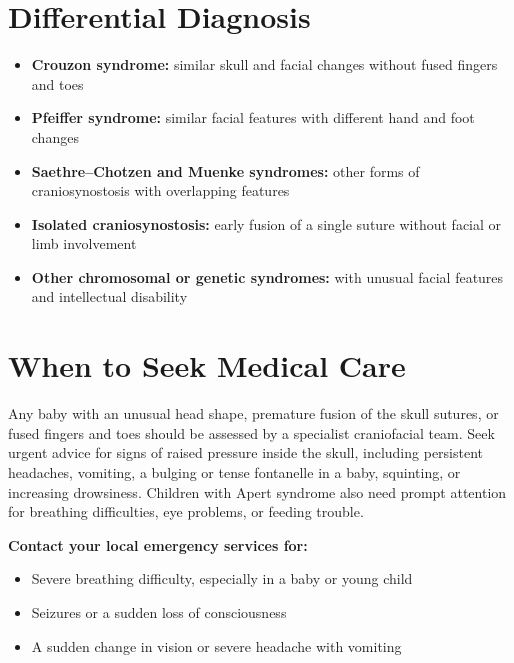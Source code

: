 \section*{Differential Diagnosis}
\begin{itemize}
    \item \textbf{Crouzon syndrome:} similar skull and facial changes without fused fingers and toes
    \item \textbf{Pfeiffer syndrome:} similar facial features with different hand and foot changes
    \item \textbf{Saethre--Chotzen and Muenke syndromes:} other forms of craniosynostosis with overlapping features
    \item \textbf{Isolated craniosynostosis:} early fusion of a single suture without facial or limb involvement
    \item \textbf{Other chromosomal or genetic syndromes:} with unusual facial features and intellectual disability
\end{itemize}

\section*{When to Seek Medical Care}
Any baby with an unusual head shape, premature fusion of the skull sutures, or fused fingers and toes should be assessed by a specialist craniofacial team. Seek urgent advice for signs of raised pressure inside the skull, including persistent headaches, vomiting, a bulging or tense fontanelle in a baby, squinting, or increasing drowsiness. Children with Apert syndrome also need prompt attention for breathing difficulties, eye problems, or feeding trouble.

\textbf{Contact your local emergency services for:}
\begin{itemize}
    \item Severe breathing difficulty, especially in a baby or young child
    \item Seizures or a sudden loss of consciousness
    \item A sudden change in vision or severe headache with vomiting
\end{itemize}

